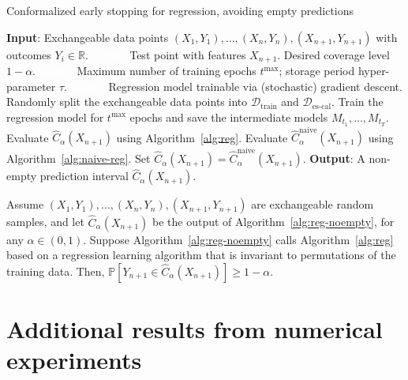 \begin{algorithm}[H]
    \caption{Conformalized early stopping for regression, avoiding empty predictions}
    \label{alg:reg-noempty}
    \begin{algorithmic}[1]
        \STATE \textbf{Input}: Exchangeable data points $(X_{1},Y_{1}), \ldots, (X_{n},Y_{n}), (X_{n+1},Y_{n+1})$ with outcomes $Y_i \in \mathbb{R}$.
        \STATE \textcolor{white}{\textbf{Input}:} Test point with features $X_{n+1}$. Desired coverage level $1-\alpha$.
        \STATE \textcolor{white}{\textbf{Input}:} Maximum number of training epochs $t^{\max}$; storage period hyper-parameter $\tau$.
        \STATE \textcolor{white}{\textbf{Input}:} Regression model trainable via (stochastic) gradient descent.
        \STATE Randomly split the exchangeable data points into $\mathcal{D}_{\text{train}}$ and $\mathcal{D}_{\text{es-cal}}$.
        \STATE Train the regression model for $t^{\text{max}}$ epochs and save the intermediate models $M_{t_1} , \dots, M_{t_T}$.
        \STATE Evaluate $\hat{C}_{\alpha}(X_{n+1})$ using Algorithm~\ref{alg:reg}.
        \STATE Evaluate $\hat{C}^{\text{naive}}_{\alpha}(X_{n+1})$ using Algorithm~\ref{alg:naive-reg}. Set $\hat{C}_{\alpha}(X_{n+1}) = \hat{C}^{\text{naive}}_{\alpha}(X_{n+1})$.
        \ENDIF
        \STATE \textbf{Output}: A non-empty prediction interval $\hat{C}_{\alpha}(X_{n+1})$.
    \end{algorithmic}
\end{algorithm}

\begin{corollary}\label{thm:reg-noempty}
Assume $(X_{1},Y_{1}), \ldots, (X_{n},Y_{n}), (X_{n+1},Y_{n+1})$ are exchangeable random samples, and let $\hat{C}_{\alpha}(X_{n+1})$ be the output of Algorithm~\ref{alg:reg-noempty}, for any $\alpha \in (0,1)$. Suppose Algorithm~\ref{alg:reg-noempty} calls Algorithm~\ref{alg:reg} based on a regression learning algorithm that is invariant to permutations of the training data. Then, $\mathbb{P}[Y_{n+1} \in \hat{C}_{\alpha}(X_{n+1})] \geq 1-\alpha$.
\end{corollary}



\clearpage
\section{Additional results from numerical experiments} \label{app:numerical-results}


